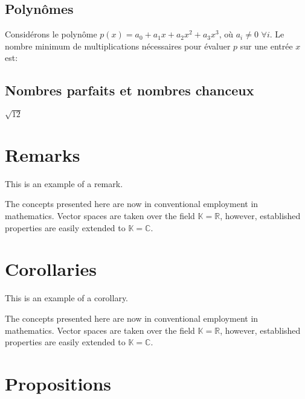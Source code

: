 \documentclass[11pt,fleqn]{book} %
\begin{document}
\subsection{Polynômes}
\begin{exercise}
Considérons le polynôme $p(x) = a_{0} + a_{1} x + a_{2} x^{2} + a_{3} x^{3}$, où $a_{i} \neq 0$ $\forall i$. Le nombre minimum de multiplications nécessaires pour évaluer $p$ sur une entrée $x$ est:
\end{exercise}
\subsection{Nombres parfaits et nombres chanceux}
\begin{exercise}
$\sqrt{12}$
\end{exercise}

\section{Remarks}

This is an example of a remark.

\begin{remark}
The concepts presented here are now in conventional employment in mathematics. Vector spaces are taken over the field $\mathbb{K}=\mathbb{R}$, however, established properties are easily extended to $\mathbb{K}=\mathbb{C}$.
\end{remark}


\section{Corollaries}

This is an example of a corollary.

\begin{corollary}
The concepts presented here are now in conventional employment in mathematics. Vector spaces are taken over the field $\mathbb{K}=\mathbb{R}$, however, established properties are easily extended to $\mathbb{K}=\mathbb{C}$.
\end{corollary}


\section{Propositions}
\end{document}
